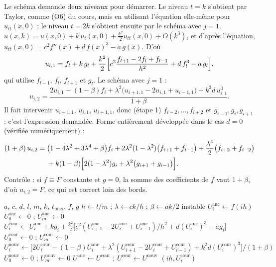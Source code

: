 \Pourquoi Le schéma demande deux niveaux pour démarrer. Le niveau $t = k$
s'obtient par Taylor, comme (O6) du cours, mais en utilisant l'équation
elle-même pour $u_{tt}(x,0)$ ; le niveau $t = 2k$ s'obtient ensuite par le
schéma avec $j = 1$.
\Etapes
{} $u(x,k) = u(x,0) + k\,u_t(x,0) + \frac{k^2}2u_{tt}(x,0) + O(k^3)$, et
d'après l'équation, $u_{tt}(x,0) = c^2f''(x) + d\,f(x)^3 - a\,g(x)$. D'où
\[
  u_{l,1} = f_l + k\,g_l + \frac{k^2}{2}\Bigl[c^2\frac{f_{l+1} - 2f_l + f_{l-1}}{h^2} + d\,f_l^3 - a\,g_l\Bigr],
\]
qui utilise $f_{l-1}$, $f_l$, $f_{l+1}$ et $g_l$.
 Le schéma avec $j = 1$ :
\[
  u_{i,2} = \frac{2u_{i,1} - (1 - \beta)f_i + \lambda^2\bigl(u_{i+1,1} - 2u_{i,1} + u_{i-1,1}\bigr)
           + k^2d\,u_{i,1}^3}{1 + \beta} .
\]
Il fait intervenir $u_{i-1,1}$, $u_{i,1}$, $u_{i+1,1}$, donc (étape 1)
$f_{i-2}, \dots, f_{i+2}$ et $g_{i-1}, g_i, g_{i+1}$ : c'est l'expression
demandée.
 Forme entièrement développée dans le cas $d = 0$ (vérifiée
numériquement) :
\[
\begin{aligned}
  (1 + \beta)\,u_{i,2} ={}& \bigl(1 - 4\lambda^2 + 3\lambda^4 + \beta\bigr)f_i
    + 2\lambda^2(1 - \lambda^2)\bigl(f_{i+1} + f_{i-1}\bigr)
    + \frac{\lambda^4}{2}\bigl(f_{i+2} + f_{i-2}\bigr)\\
  &+ k(1 - \beta)\Bigl[2(1 - \lambda^2)g_i + \lambda^2\bigl(g_{i+1} + g_{i-1}\bigr)\Bigr].
\end{aligned}
\]
Contrôle : si $f \equiv F$ constante et $g = 0$, la somme des coefficients de $f$
vaut $1 + \beta$, d'où $u_{i,2} = F$, ce qui est correct loin des bords.

\begin{algo}
  \Require $a$, $c$, $d$, $l$, $m$, $k$, $t_{\max}$, $f$, $g$
  \State $h \leftarrow l/m$ ; $\lambda \leftarrow ck/h$ ; $\beta \leftarrow ak/2$
   \Print \og instable \fg{} \EndIf
   \State $U^{\text{anc}}_i \leftarrow f(ih)$ \EndFor
  \State $U^{\text{anc}}_0 \leftarrow 0$ ; $U^{\text{anc}}_m \leftarrow 0$
    \State $U^{\text{cour}}_i \leftarrow U^{\text{anc}}_i + kg_i + \frac{k^2}2\bigl[c^2(U^{\text{anc}}_{i+1} - 2U^{\text{anc}}_i + U^{\text{anc}}_{i-1})/h^2 + d(U^{\text{anc}}_i)^3 - ag_i\bigr]$
  \EndFor
  \State $U^{\text{cour}}_0 \leftarrow 0$ ; $U^{\text{cour}}_m \leftarrow 0$
      \State $U^{\text{nouv}}_i \leftarrow \bigl[2U^{\text{cour}}_i - (1-\beta)U^{\text{anc}}_i + \lambda^2(U^{\text{cour}}_{i+1} - 2U^{\text{cour}}_i + U^{\text{cour}}_{i-1}) + k^2d(U^{\text{cour}}_i)^3\bigr]/(1+\beta)$
    \EndFor
    \State $U^{\text{nouv}}_0 \leftarrow 0$ ; $U^{\text{nouv}}_m \leftarrow 0$
    \State $U^{\text{anc}} \leftarrow U^{\text{cour}}$ ; $U^{\text{cour}} \leftarrow U^{\text{nouv}}$
  \EndFor
  \Print $(ih, U^{\text{cour}}_i)$
\end{algo}

